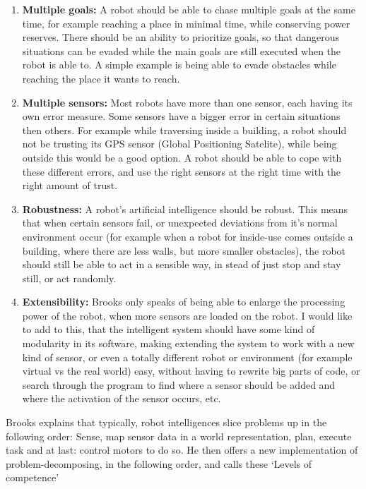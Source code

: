 \documentclass[a4paper,10pt]{article}
\begin{document}
\begin{enumerate}
    \item \textbf{Multiple goals:} A robot should be able to chase multiple goals at the
    same time, for example reaching a place in minimal time, while conserving
    power reserves. There should be an ability to prioritize goals, so that
    dangerous situations can be evaded while the main goals are still executed
    when the robot is able to. A simple example is being able to evade obstacles
    while reaching the place it wants to reach.
    \item \textbf{Multiple sensors:} Most robots have more than one sensor, each
    having its own error measure. Some sensors have a bigger error in certain
    situations then others. For example while traversing inside a building, a
    robot should not be trusting its GPS sensor (Global Positioning Satelite),
    while being outside this would be a good option. A robot should be able to
    cope with these different errors, and use the right sensors at the right
    time with the right amount of trust.
    \item \textbf{Robustness:} A robot's artificial intelligence should be
    robust. This means that when certain sensors fail, or unexpected
    deviations from it's normal environment occur (for example when a robot for
    inside-use comes outside a building, where there are less walls, but more
    smaller obstacles), the robot should still be able to act in a sensible way,
    in stead of just stop and stay still, or act randomly.
    \item \textbf{Extensibility:} Brooks only speaks of being able to enlarge
    the processing power of the robot, when more sensors are loaded on the
    robot. I would like to add to this, that the intelligent system should have
    some kind of modularity in its software, making extending the system to work with a new kind
    of sensor, or even a totally different robot or environment (for example
    virtual vs the real world) easy, without having to rewrite big parts of
    code, or search through the program to find where a sensor should be added
    and where the activation of the sensor occurs, etc.
\end{enumerate}

Brooks explains that typically, robot intelligences slice problems up in the
following order: Sense, map sensor data in a world representation, plan, execute
task and at last: control motors to do so. He then offers a new implementation
of problem-decomposing, in the following order, and calls these `Levels of
competence'
\end{document}
